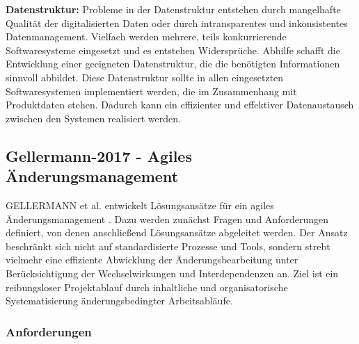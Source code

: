 \textbf{Datenstruktur: }
Probleme in der Datenstruktur entstehen durch mangelhafte Qualität der digitalisierten Daten oder durch intransparentes und inkonsistentes Datenmanagement. Vielfach werden mehrere, teils konkurrierende Softwaresysteme eingesetzt und es entstehen Widersprüche. 
Abhilfe schafft die Entwicklung einer geeigneten Datenstruktur, die die benötigten Informationen sinnvoll abbildet. Diese Datenstruktur sollte in allen eingesetzten Softwaresystemen implementiert werden, die im Zusammenhang mit Produktdaten stehen. Dadurch kann ein effizienter und effektiver Datenaustausch zwischen den Systemen realisiert werden.  

\subsection*{Gellermann-2017 - Agiles Änderungsmanagement}

GELLERMANN et al. entwickelt Lösungsansätze für ein agiles Änderungsmanagement \autocite{Gellermann2017}. Dazu werden zunächst Fragen und Anforderungen definiert, von denen anschließend Lösungsansätze abgeleitet werden. Der Ansatz beschränkt sich nicht auf standardisierte Prozesse und Tools, sondern strebt vielmehr eine effiziente Abwicklung der Änderungsbearbeitung unter Berücksichtigung der Wechselwirkungen und Interdependenzen an.  Ziel ist ein reibungsloser Projektablauf durch inhaltliche und organisatorische Systematisierung änderungsbedingter Arbeitsabläufe. 

\subsubsection*{Anforderungen}

